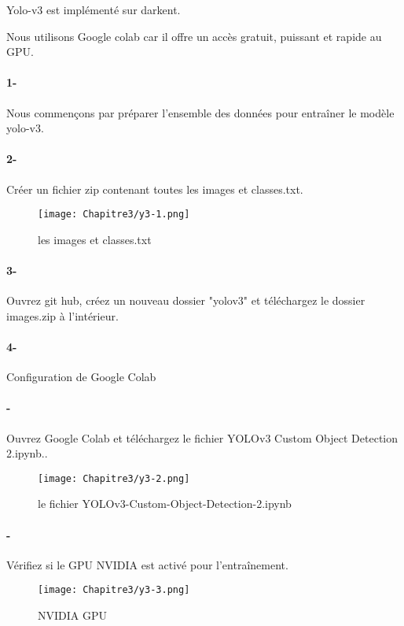      Yolo-v3 est implémenté sur darkent.
      
     Nous utilisons Google colab car il offre un accès gratuit, puissant et rapide au GPU.
     
      \paragraph{1-} Nous commençons par préparer l'ensemble des données pour entraîner le modèle yolo-v3. 
      \paragraph{2-} Créer un fichier zip contenant toutes les images et classes.txt.
      \begin{figure}[H]
           \centering
           \texttt{[image: Chapitre3/y3-1.png]}
           \caption{les images et classes.txt}
           \label{y3-1}
           \end{figure}  
                    
      
      \paragraph{3-} Ouvrez git hub, créez un nouveau dossier "yolov3" et téléchargez le dossier images.zip à l'intérieur.
      \paragraph{4-} Configuration de Google Colab
      \paragraph{-} Ouvrez Google Colab et téléchargez le fichier YOLOv3 Custom Object Detection 2.ipynb.\cite{yolo_collab}.
      \begin{figure}[H]
           \centering
           \texttt{[image: Chapitre3/y3-2.png]}
           \caption{le fichier YOLOv3-Custom-Object-Detection-2.ipynb}
           \label{y3-2}
           \end{figure}  

      \paragraph{-} Vérifiez si le GPU NVIDIA est activé pour l'entraînement.
         \begin{figure}[H]
              \centering
              \texttt{[image: Chapitre3/y3-3.png]}
              \caption{NVIDIA GPU}
              \label{y3-3}
              \end{figure} 
          
